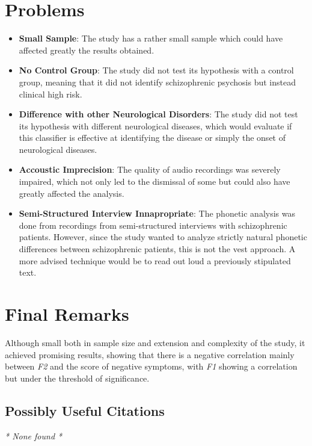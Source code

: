 \documentclass{Paper_Summary}
\begin{document}
\section{Problems}
    \begin{itemize}
         \item \textbf{Small Sample}: The study has a rather small sample which could have affected greatly the results obtained.
         \item \textbf{No Control Group}: The study did not test its hypothesis with a control group, meaning that it did not identify schizophrenic psychosis but instead clinical high risk.
         \item \textbf{Difference with other Neurological Disorders}: The study did not test its hypothesis with different neurological diseases, which would evaluate if this classifier is effective at identifying the disease or simply the onset of neurological diseases.
         \item \textbf{Accoustic Imprecision}: The quality of audio recordings was severely impaired, which not only led to the dismissal of some but could also have greatly affected the analysis.
         \item \textbf{Semi-Structured Interview Innapropriate}: The phonetic analysis was done from recordings from semi-structured interviews with schizophrenic patients. However, since the study wanted to analyze strictly natural phonetic differences between schizophrenic patients, this is not the vest approach. A more advised technique would be to read out loud a previously stipulated text.
    \end{itemize}


\section{Final Remarks}
    
    Although small both in sample size and extension and complexity of the study, it achieved promising results, showing that there is a negative correlation mainly between \emph{F2} and the score of negative symptoms, with \emph{F1} showing a correlation but under the threshold of significance.

\breakline

\begin{center}
    \section*{Possibly Useful Citations}
\end{center}
\emph{* None found *}
\end{document}
